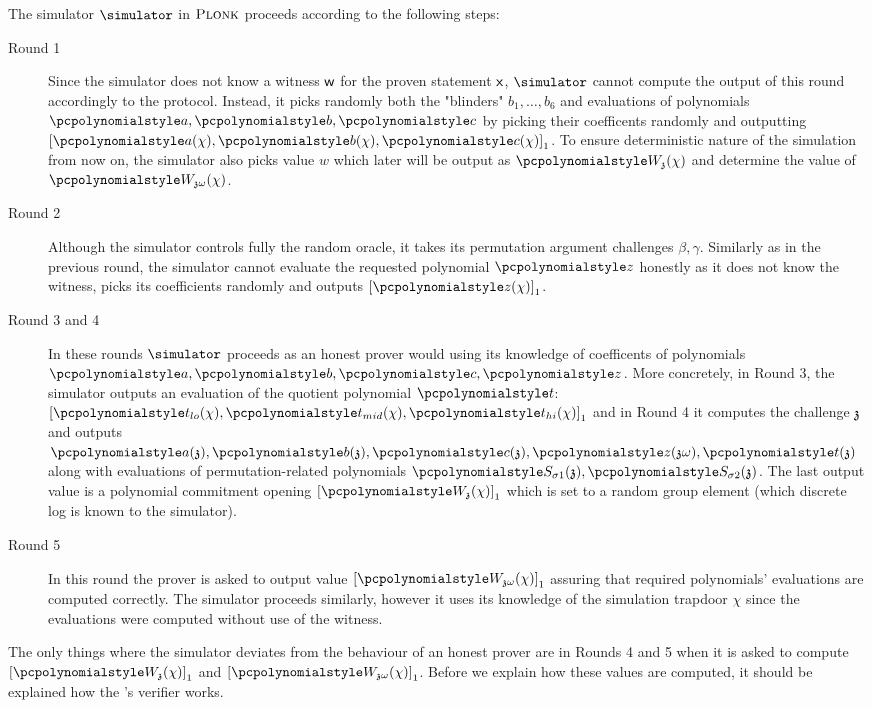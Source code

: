 \documentclass[runningheads,11pt]{llncs}
\theoremstyle{definition}
\begin{document}
\paragraph{} \\
The simulator $\simulator$ in $\textsc{Plonk}$ proceeds according to the following steps:
\begin{description}
	\item[Round 1]
	Since the simulator does not know a witness $\mathsf{w}$ for the proven statement $\mathsf{x}$, $\simulator$ cannot compute the output of this round accordingly to the protocol. Instead, it picks randomly both the "blinders" $b_1, \ldots, b_6$ and evaluations of polynomials $\p{a}, \p{b}, \p{c}$ by picking their coefficents randomly and outputting $\gone{\p{a}(\chi), \p{b}(\chi), \p{c}(\chi)}$.
	To ensure deterministic nature of the simulation from now on, the simulator also picks value $w$ which later will be output as $\p{W}_\chz(\chi)$ and determine the value of $\p{W}_{\chz \omega}(\chi)$.
	\item[Round 2]
	Although the simulator controls fully the random oracle, it takes its permutation argument challenges $\beta, \gamma$.
	Similarly as in the previous round, the simulator cannot evaluate the requested polynomial $\p{z}$ honestly as it does not know the witness, picks its coefficients randomly and outputs $\gone{\p{z}(\chi)}$.
	\item[Round 3 and 4]
	In these rounds $\simulator$ proceeds as an honest prover would using its knowledge of coefficents of polynomials $\p{a}, \p{b}, \p{c}, \p{z}$.
	More concretely, in Round 3, the simulator outputs an evaluation of the quotient polynomial $\p{t}$: $\gone{\p{t}_{lo}(\chi), \p{t}_{mid}(\chi), \p{t}_{hi}(\chi)}$ and in
	Round 4 it computes the challenge $\mathfrak{z}$ and outputs $\p{a}(\chz), \p{b}(\chz), \p{c}(\chz), \p{z}(\chz \omega), \p{t}(\chz)$ along with evaluations of permutation-related polynomials $\p{S_{\sigma 1}(\chz)}, \p{S_{\sigma 2}(\chz)}$. 
	The last output value is a polynomial commitment opening $\gone{\p{W}_{\chz}(\chi)}$ which is set to a random group element (which discrete log is known to the simulator).
	\item[Round 5]
	In this round the prover is asked to output value $\gone{\p{W}_{\chz \omega}(\chi)}$ assuring that required polynomials' evaluations are computed correctly. The simulator proceeds similarly, however it uses its knowledge of the simulation trapdoor $\chi$ since the evaluations were computed without use of the witness.
\end{description}
	The only things where the simulator deviates from the behaviour of an honest prover are in Rounds 4 and 5 when it is asked to compute $\gone{\p{W}_{\chz}(\chi)}$ and $\gone{\p{W}_{\chz \omega}(\chi)}$. 
	Before we explain how these values are computed, it should be explained how the \plonk's verifier works.
\end{document}
